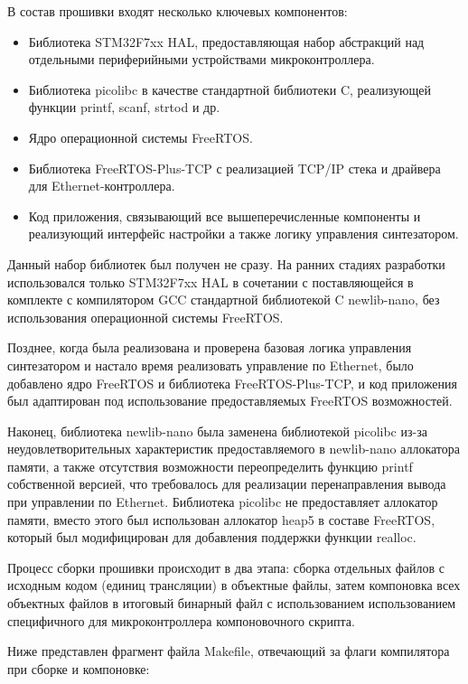 \documentclass[rusmathsym, eqnumwithinsec, amspack, hyperref]{bomgost}
\begin{document}
В состав прошивки входят несколько ключевых компонентов:

\begin{itemize}
	\item Библиотека STM32F7xx HAL, предоставляющая набор абстракций над отдельными периферийными устройствами микроконтроллера.
	\item Библиотека picolibc в качестве стандартной библиотеки C, реализующей функции printf, scanf, strtod и др.
	\item Ядро операционной системы FreeRTOS.
	\item Библиотека FreeRTOS-Plus-TCP с реализацией TCP/IP стека и драйвера для Ethernet-контроллера.
	\item Код приложения, связывающий все вышеперечисленные компоненты и реализующий интерфейс настройки а также логику управления синтезатором.
\end{itemize}

Данный набор библиотек был получен не сразу. На ранних стадиях разработки использовался только STM32F7xx HAL в сочетании с поставляющейся в комплекте с компилятором GCC стандартной библиотекой C newlib-nano, без использования операционной системы FreeRTOS.

Позднее, когда была реализована и проверена базовая логика управления синтезатором и настало время реализовать управление по Ethernet, было добавлено ядро FreeRTOS и библиотека FreeRTOS-Plus-TCP, и код приложения был адаптирован под использование предоставляемых FreeRTOS возможностей.

Наконец, библиотека newlib-nano была заменена библиотекой picolibc из-за неудовлетворительных характеристик предоставляемого в newlib-nano аллокатора памяти, а также отсутствия возможности переопределить функцию printf собственной версией, что требовалось для реализации перенаправления вывода при управлении по Ethernet. Библиотека picolibc не предоставляет аллокатор памяти, вместо этого был использован аллокатор heap5 в составе FreeRTOS, который был модифицирован для добавления поддержки функции realloc.

Процесс сборки прошивки происходит в два этапа: сборка отдельных файлов с исходным кодом (единиц трансляции) в объектные файлы, затем компоновка всех объектных файлов в итоговый бинарный файл с использованием использованием специфичного для микроконтроллера компоновочного скрипта.

Ниже представлен фрагмент файла Makefile, отвечающий за флаги компилятора при сборке и компоновке:
\end{document}
